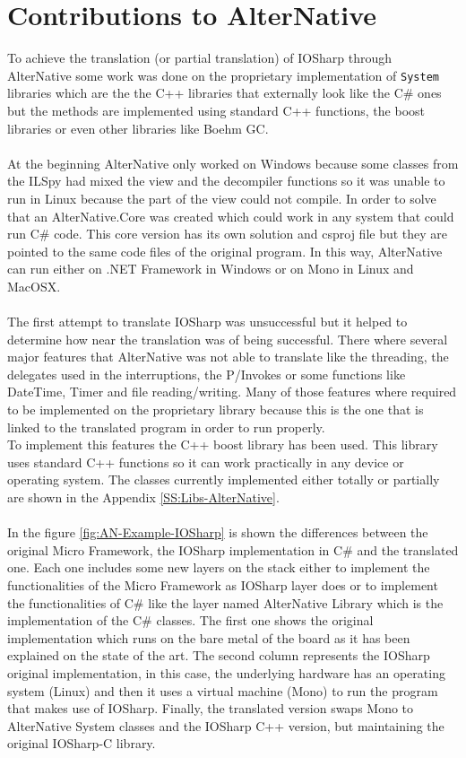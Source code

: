 \section{Contributions to AlterNative}\label{AN-WorkDone}
To achieve the translation (or partial translation) of IOSharp through AlterNative some work was done on the proprietary implementation of \verb!System! libraries which are the the C++ libraries that externally look like the C\# ones but the methods are implemented using standard C++ functions, the boost libraries or even other libraries like Boehm GC.
\\
\\
At the beginning AlterNative only worked on Windows because some classes from the ILSpy had mixed the view and the decompiler functions so it was unable to run in Linux because the part of the view could not compile. In order to solve that an AlterNative.Core was created which could work in any system that could run C\# code. This core version has its own solution and csproj file but they are pointed to the same code files of the original program. In this way, AlterNative can run either on .NET Framework in Windows or on Mono in Linux and MacOSX.
\\
\\
The first attempt to translate IOSharp was unsuccessful but it helped to determine how near the translation was of being successful. There where several major features that AlterNative was not able to translate like the threading, the delegates used in the interruptions, the P/Invokes or some functions like DateTime, Timer and file reading/writing. Many of those features where required to be implemented on the proprietary library because this is the one that is linked to the translated program in order to run properly.
\\
To implement this features the C++ boost library has been used. This library uses standard C++ functions so it can work practically in any device or operating system. The classes currently implemented either totally or partially are shown in the Appendix \ref{SS:Libs-AlterNative}.
\\
\\
In the figure \ref{fig:AN-Example-IOSharp} is shown the differences between the original Micro Framework, the IOSharp implementation in C\# and the translated one. Each one includes some new layers on the stack either to implement the functionalities of the Micro Framework as IOSharp layer does or to implement the functionalities of C\# like the layer named AlterNative Library which is the implementation of the C\# classes. The first one shows the original implementation which runs on the bare metal of the board as it has been explained on the state of the art. The second column represents the IOSharp original implementation, in this case, the underlying hardware has an operating system (Linux) and then it uses a virtual machine (Mono) to run the program that makes use of IOSharp. Finally, the translated version swaps Mono to AlterNative System classes and the IOSharp C++ version, but maintaining the original IOSharp-C library.

